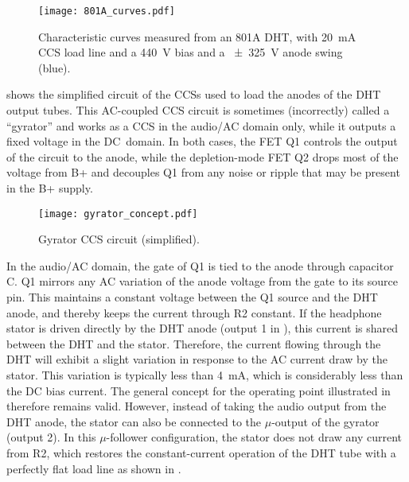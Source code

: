 \begin{figure}
\begin{center}
\texttt{[image: 801A\_curves.pdf]}
\caption{Characteristic curves measured from an 801A DHT, with \SI{20}{mA} CCS load line and a \SI{440}{V} bias and a \SI{\pm325}{V} anode swing (blue).}
\end{center}
\end{figure}

 shows the simplified circuit of the CCSs used to load the anodes of the DHT output tubes. This AC-coupled CCS circuit is sometimes (incorrectly) called a ``gyrator''\cite{gyrator_term} and works as a CCS in the audio/AC domain only, while it outputs a fixed voltage in the DC domain.\cite{mogliaa_gyrator} In both cases, the FET Q1 controls the output of the circuit to the anode, while the depletion-mode FET Q2 drops most of the voltage from B+ and decouples Q1 from any noise or ripple that may be present in the B+ supply.\par

\begin{figure}
\begin{center}
\texttt{[image: gyrator\_concept.pdf]}
\caption{Gyrator CCS circuit (simplified).}
\end{center}
\end{figure}

In the audio/AC domain, the gate of Q1 is tied to the anode through capacitor C. Q1 mirrors any AC variation of the anode voltage from the gate to its source pin. This maintains a constant voltage between the Q1 source and the DHT anode, and thereby keeps the current through R2 constant. If the headphone stator is driven directly by the DHT anode (output 1 in ), this current is shared between the DHT and the stator. Therefore, the current flowing through the DHT will exhibit a slight variation in response to the AC current draw by the stator. This variation is typically less than \SI{4}{mA}\cite{osdeha_p8}, which is considerably less than the DC bias current. The general concept for the operating point illustrated in  therefore remains valid. However, instead of taking the audio output from the DHT anode, the stator can also be connected to the $\mu$-output of the gyrator (output 2). In this $\mu$-follower configuration\cite{pimm_ccs,kimmel_mustage}, the stator does not draw any current from R2, which restores the constant-current operation of the DHT tube with a perfectly flat load line as shown in .\par


